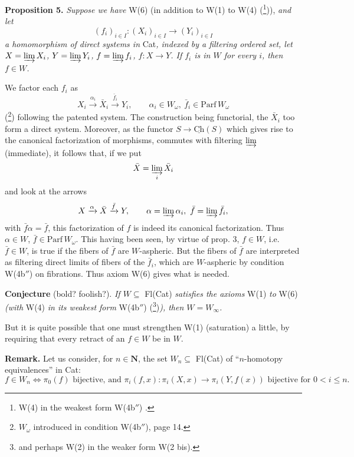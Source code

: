 \documentclass[11pt]{article}
\newcommand{\printedpage}[1]{\marginpar{\footnotesize p.~#1}}
\newcommand{\msp}[1]{\marginpar{\footnotesize [#1]}}
\newcommand{\Ch}{\underline{\mathrm{Ch}}}
\begin{document}
\textbf{Proposition 5.} \textit{Suppose we have} W(6) (in addition to W(1) to W(4) (\footnote[34]{W(4) in the weakest form W(4b$''$) .})),
\msp{page 15}\textit{and let}
\[ (f_i)_{i\in I} : (X_i)_{i\in I} \longrightarrow (Y_i)_{i\in I} \]
\printedpage{13}
\textit{a homomorphism of direct systems in} Cat\textit{, indexed by a filtering ordered set, let $X = \varinjlim X_i$, $Y = \varinjlim Y_i$, $f = \varinjlim f_i$, $f : X \longrightarrow Y$. If $f_i$ is in $W$ for every $i$, then $f \in W$.}

We factor each $f_i$ as
\[ X_i \xrightarrow{\alpha_i} \bar{X}_i \xrightarrow{\bar{f}_i} Y_i, \qquad \alpha_i \in W_\omega,\ \bar{f}_i \in \mathrm{Parf}\, W_\omega \]
(\footnote[35]{$W_\omega$ introduced in condition W(4b$''$), page 14.}) following the patented system. The construction being functorial, the $\bar{X}_i$ too form a direct system. Moreover, as the functor $S \longrightarrow \Ch(S)$ which gives rise to the canonical factorization of morphisms, commutes with filtering $\varinjlim$ (immediate), it follows that, if we put
\[ \bar{X} = \varinjlim_{i} \bar{X}_i \]
and look at the arrows
\[ X \xrightarrow{\alpha} \bar{X} \xrightarrow{\bar{f}} Y, \qquad \alpha = \varinjlim \alpha_i,\ \bar{f} = \varinjlim \bar{f}_i, \]
with $\bar{f}\alpha = \bar{f}$, this factorization of $f$ is indeed its canonical factorization. Thus $\alpha \in W$, %
$\bar{f} \in \mathrm{Parf}\, W_\omega$. This having been seen, by virtue of prop. 3, $f \in W$, i.e. $\bar{f} \in W$, is true if the fibers of $\bar{f}$ are $W$-aspheric. But the fibers of $\bar{f}$ are interpreted as filtering direct limits of fibers of the $\bar{f}_i$, which are $W$-aspheric by condition W(4b$''$) on fibrations. Thus axiom W(6) gives what is needed.

\textbf{Conjecture} (bold? foolish?). \textit{If $W \subseteq$} Fl(Cat) \textit{satisfies the axioms} W(1) \textit{to} W(6) \textit{(with} W(4) \textit{in its weakest form} W(4b$''$) (\footnote[36]{and perhaps W(2) in the weaker form W(2 bis).})\textit{), then $W = W_\infty$.}

\msp{page 16}But it is quite possible that one must strengthen W(1) (saturation) a little, by requiring that every retract of an $f \in W$ be in $W$.

\textbf{Remark.} Let us consider, for $n \in \mathbf{N}$, the set $W_n \subseteq$ Fl(Cat) of ``$n$-homotopy equivalences'' in Cat:
\[ f \in W_n \iff \pi_0(f) \text{ bijective, and } \pi_i(f, x) : \pi_i(X, x) \longrightarrow \pi_i(Y, f(x)) \text{ bijective for } 0 < i \leq n. \]
\end{document}
